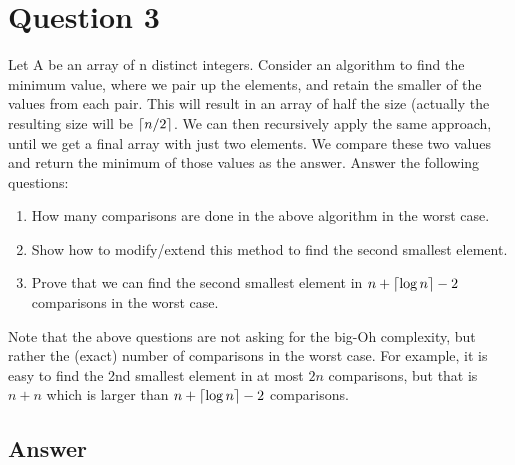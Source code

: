 \documentclass[
	12pt
]{fphw}
\DeclarePairedDelimiter\ceil{\lceil}{\rceil}
\begin{document}
\pagebreak
\section*{Question 3}

\begin{problem}
	Let A be an array of n distinct integers. Consider an algorithm to find the minimum value, where we pair up the elements, and retain the smaller of the values from each pair. This will result in an array of half the size (actually the resulting size will be $\ceil*{n/2}$. We can then recursively apply the same approach, until we get a final array with just two elements. We compare these two values and return the minimum of those values as the answer. Answer the following questions:
	
	
	
	
	\medskip
	
	\begin{enumerate}
		\item How many comparisons are done in the above algorithm in the worst case.
		\item Show how to modify/extend this method to find the second smallest element.
		\item Prove that we can find the second smallest element in $n + \ceil*{\log n} - 2$ comparisons in the worst case.
	\end{enumerate}

	Note that the above questions are not asking for the big-Oh complexity, but rather the (exact) number of comparisons in the worst case. For example, it is easy to find the 2nd smallest element in at most $2n$ comparisons, but that is $n + n$ which is larger than $n + \ceil*{\log n} - 2$ comparisons.
\end{problem}


\subsection*{Answer} 
\end{document}
